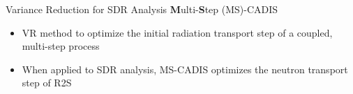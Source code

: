 \documentclass{beamer}
\begin{document}
\begin{frame}{Variance Reduction for SDR Analysis}
  \textbf{M}ulti-\textbf{S}tep (MS)-CADIS \cite{mscadis}
  \begin{itemize}
  \item {VR method to optimize the initial radiation transport step of a
	  coupled, multi-step process}
	  
	  \item{When applied to SDR analysis, MS-CADIS optimizes the
		  neutron transport step of R2S}
\end{itemize}
%
\end{frame}
\end{document}
